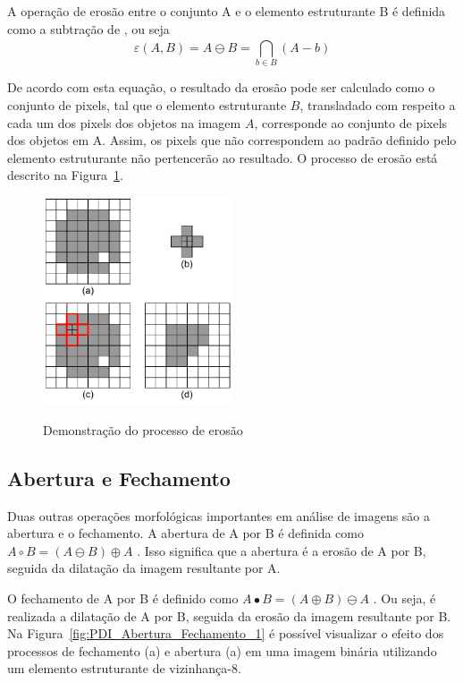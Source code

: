 \documentclass[12pt,oneside,a4paper,english,french,spanish,brazil,]{abntex2}
\begin{document}
A operação de erosão entre o conjunto A e o elemento estruturante B é definida como a subtração de \citet{minkowski:1911}, ou seja \[\varepsilon(A,B)=A\ominus B=\bigcap_{b\in B}^{ } (A-b)\]

De acordo com esta equação, o resultado da erosão pode ser calculado como o conjunto de pixels, tal que o elemento estruturante \(B\), transladado com respeito a cada um dos pixels dos objetos na imagem \(A\), corresponde ao conjunto de pixels dos objetos em A. Assim, os pixels que não correspondem ao padrão definido pelo elemento estruturante não pertencerão ao resultado. O processo de erosão está descrito na Figura~\ref{fig:PDI_Erosao_1}.

\begin{figure}[ht]
\centering
\caption{Demonstração do processo de erosão}
\includegraphics[width=0.5\textwidth]{imagens/PDI_Erosao_1.pdf}
\sourceAuthor
\label{fig:PDI_Erosao_1}
\end{figure}

\subsection{Abertura e Fechamento}

Duas outras operações morfológicas importantes em análise de imagens são a abertura e o fechamento. A abertura de A por B é definida como \(A \circ  B = (A \ominus B) \oplus A\) \cite{pedrini:2008}. Isso significa que a abertura é a erosão de A por B, seguida da dilatação da imagem resultante por A.

O fechamento de A por B é definido como \(A \bullet  B = (A \oplus B) \ominus A\) \cite{pedrini:2008}. Ou seja, é realizada a dilatação de A por B, seguida da erosão da imagem resultante por B.
Na Figura~\ref{fig:PDI_Abertura_Fechamento_1} é possível visualizar o efeito dos processos de fechamento (a) e abertura (a) em uma imagem binária utilizando um elemento estruturante de vizinhança-8.
\end{document}
